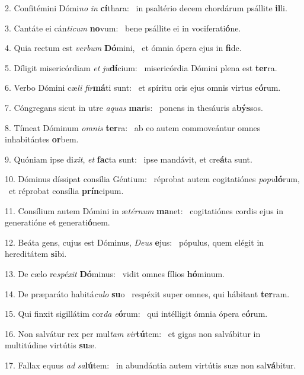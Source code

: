 2. Confitémini Dómi\textit{no} \textit{in} \textbf{cí}thara: \ast\  in psaltério decem chordárum psállite \textbf{il}li.\

3. Cantáte ei cán\textit{ti}\textit{cum} \textbf{no}vum: \ast\  bene psállite ei in vociferati\textbf{ó}ne.\

4. Quia rectum est \textit{ver}\textit{bum} \textbf{Dó}mini, \ast\  et ómnia ópera ejus in \textbf{fi}de.\

5. Díligit misericórdiam \textit{et} \textit{ju}\textbf{dí}cium: \ast\  misericórdia Dómini plena est \textbf{ter}ra.\

6. Verbo Dómini cæ\textit{li} \textit{fir}\textbf{má}ti sunt: \ast\  et spíritu oris ejus omnis virtus e\textbf{ó}rum.\

7. Cóngregans sicut in utre \textit{a}\textit{quas} \textbf{ma}ris: \ast\  ponens in thesáuris a\textbf{býs}sos.\

8. Tímeat Dóminum \textit{om}\textit{nis} \textbf{ter}ra: \ast\  ab eo autem commoveántur omnes inhabitántes \textbf{or}bem.\

9. Quóniam ipse di\textit{xit}, \textit{et} \textbf{fac}ta sunt: \ast\  ipse mandávit, et cre\textbf{á}ta sunt.\

10. Dóminus díssipat consília Géntium: \dag\  réprobat autem cogitatiónes \textit{po}\textit{pu}\textbf{ló}rum, \ast\  et réprobat consília \textbf{prín}cipum.\

11. Consílium autem Dómini in æ\textit{tér}\textit{num} \textbf{ma}net: \ast\  cogitatiónes cordis ejus in generatióne et generati\textbf{ó}nem.\

12. Beáta gens, cujus est Dóminus, \textit{De}\textit{us} \textbf{e}jus: \ast\  pópulus, quem elégit in hereditátem \textbf{si}bi.\

13. De cælo re\textit{spé}\textit{xit} \textbf{Dó}minus: \ast\  vidit omnes fílios \textbf{hó}minum.\

14. De præparáto habitá\textit{cu}\textit{lo} \textbf{su}o \ast\  respéxit super omnes, qui hábitant \textbf{ter}ram.\

15. Qui finxit sigillátim cor\textit{da} \textit{e}\textbf{ó}rum: \ast\  qui intélligit ómnia ópera e\textbf{ó}rum.\

16. Non salvátur rex per mul\textit{tam} \textit{vir}\textbf{tú}tem: \ast\  et gigas non salvábitur in multitúdine virtútis \textbf{su}æ.\

17. Fallax equus \textit{ad} \textit{sa}\textbf{lú}tem: \ast\  in abundántia autem virtútis suæ non sal\textbf{vá}bitur.\

